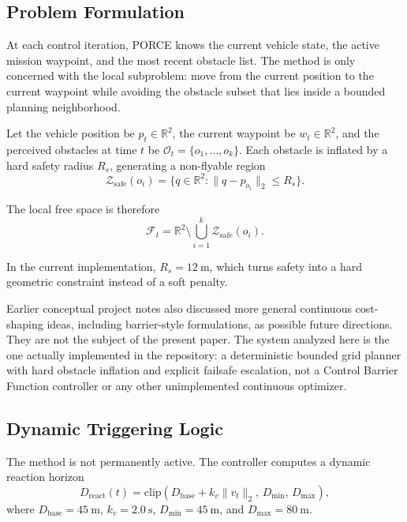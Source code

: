 \documentclass[journal,twoside,web]{ieeecolor}
\begin{document}
\subsection{Problem Formulation}

At each control iteration, PORCE knows the current vehicle state, the active mission waypoint, and the most recent obstacle list. The method is only concerned with the local subproblem: move from the current position to the current waypoint while avoiding the obstacle subset that lies inside a bounded planning neighborhood.

Let the vehicle position be \(p_t \in \mathbb{R}^2\), the current waypoint be \(w_t \in \mathbb{R}^2\), and the perceived obstacles at time \(t\) be \(\mathcal{O}_t = \{o_1,\dots,o_k\}\). Each obstacle is inflated by a hard safety radius \(R_s\), generating a non-flyable region
\begin{equation}
    \mathcal{Z}_{\mathrm{safe}}(o_i) = \{q \in \mathbb{R}^2 : \lVert q - p_{o_i} \rVert_2 \le R_s\}.
\end{equation}

The local free space is therefore
\begin{equation}
    \mathcal{F}_t = \mathbb{R}^2 \setminus \bigcup_{i=1}^{k} \mathcal{Z}_{\mathrm{safe}}(o_i).
\end{equation}

In the current implementation, \(R_s = \SI{12}{\meter}\), which turns safety into a hard geometric constraint instead of a soft penalty.

Earlier conceptual project notes also discussed more general continuous cost-shaping ideas, including barrier-style formulations, as possible future directions. They are not the subject of the present paper. The system analyzed here is the one actually implemented in the repository: a deterministic bounded grid planner with hard obstacle inflation and explicit failsafe escalation, not a Control Barrier Function controller or any other unimplemented continuous optimizer.

\subsection{Dynamic Triggering Logic}

The method is not permanently active. The controller computes a dynamic reaction horizon
\begin{equation}
    D_{\mathrm{react}}(t) =
    \mathrm{clip}\!\left(D_{\mathrm{base}} + k_v \lVert v_t \rVert_2,\,
    D_{\min},\, D_{\max}\right),
\end{equation}
where \(D_{\mathrm{base}}=\SI{45}{\meter}\), \(k_v=\SI{2.0}{\second}\), \(D_{\min}=\SI{45}{\meter}\), and \(D_{\max}=\SI{80}{\meter}\).
\end{document}
